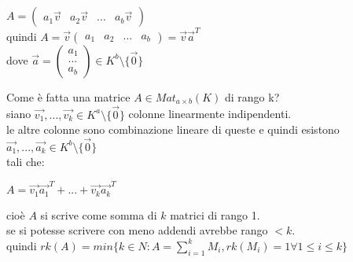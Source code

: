 \documentclass[a4paper,12pt]{article}
\theoremstyle{def}
\theoremstyle{prop}
\theoremstyle{esempio}
\theoremstyle{dimostrazione}
\theoremstyle{teo}
\theoremstyle{osservazione}
\begin{document}
\begin{center}
	\(A = \begin{pmatrix}
		a_1 \overrightarrow{v} & a_2 \overrightarrow{v} & ... & a_b \overrightarrow{v}
	\end{pmatrix}\)\\
	quindi \(A = \overrightarrow{v} \begin{pmatrix}
		a_1 & a_2 & ... & a_b
	\end{pmatrix} = \overrightarrow{v}\overrightarrow{a}^T\)\\
	dove \(\overrightarrow{a} = \begin{pmatrix}
		a_1 \\
		... \\
		a_b
	\end{pmatrix} \in K^b \setminus \{\overrightarrow{0}\}\)\\
\end{center}

Come è fatta una matrice \(A \in Mat_{a \times b}(K)\) di rango k?\\
siano \(\overrightarrow{v_1}, ..., \overrightarrow{v_k} \in K^a \setminus \{\overrightarrow{0}\}\) colonne linearmente indipendenti.\\
le altre colonne sono combinazione lineare di queste e quindi esistono \(\overrightarrow{a_1}, ..., \overrightarrow{a_k} \in K^b \setminus \{\overrightarrow{0}\}\)\\
tali che:
\begin{center}
	\(A = \overrightarrow{v_1}\overrightarrow{a_1}^T + ... + \overrightarrow{v_k}\overrightarrow{a_k}^T\)
\end{center}
cioè \(A\) si scrive come somma di \(k\) matrici di rango 1.\\
se si potesse scrivere con meno addendi avrebbe rango \(< k\).\\
quindi \(rk(A) = min \{ k \in N : A = \sum_{i=1}^{k} M_i, rk(M_i) = 1 \forall 1 \leq i \leq k\}\)\\

\newpage
\end{document}
